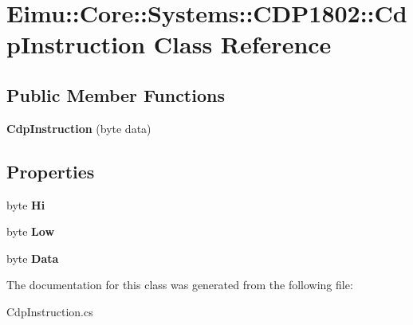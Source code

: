 \hypertarget{class_eimu_1_1_core_1_1_systems_1_1_c_d_p1802_1_1_cdp_instruction}{
\section{Eimu::Core::Systems::CDP1802::CdpInstruction Class Reference}
\label{class_eimu_1_1_core_1_1_systems_1_1_c_d_p1802_1_1_cdp_instruction}
}
\subsection*{Public Member Functions}
\begin{DoxyCompactItemize}
\item 
\hypertarget{class_eimu_1_1_core_1_1_systems_1_1_c_d_p1802_1_1_cdp_instruction_a213521de04eaef2c87b4e6edfab90bae}{
{\bfseries CdpInstruction} (byte data)}
\label{class_eimu_1_1_core_1_1_systems_1_1_c_d_p1802_1_1_cdp_instruction_a213521de04eaef2c87b4e6edfab90bae}

\end{DoxyCompactItemize}
\subsection*{Properties}
\begin{DoxyCompactItemize}
\item 
\hypertarget{class_eimu_1_1_core_1_1_systems_1_1_c_d_p1802_1_1_cdp_instruction_a283e3a21f3f8f668adcc49614ecb1c27}{
byte {\bfseries Hi}}
\label{class_eimu_1_1_core_1_1_systems_1_1_c_d_p1802_1_1_cdp_instruction_a283e3a21f3f8f668adcc49614ecb1c27}

\item 
\hypertarget{class_eimu_1_1_core_1_1_systems_1_1_c_d_p1802_1_1_cdp_instruction_a6004175628f54fda09c71e97db647d33}{
byte {\bfseries Low}}
\label{class_eimu_1_1_core_1_1_systems_1_1_c_d_p1802_1_1_cdp_instruction_a6004175628f54fda09c71e97db647d33}

\item 
\hypertarget{class_eimu_1_1_core_1_1_systems_1_1_c_d_p1802_1_1_cdp_instruction_ac6d324ac44ac657eae1ccc4466baab41}{
byte {\bfseries Data}}
\label{class_eimu_1_1_core_1_1_systems_1_1_c_d_p1802_1_1_cdp_instruction_ac6d324ac44ac657eae1ccc4466baab41}

\end{DoxyCompactItemize}


The documentation for this class was generated from the following file:\begin{DoxyCompactItemize}
\item 
CdpInstruction.cs\end{DoxyCompactItemize}
